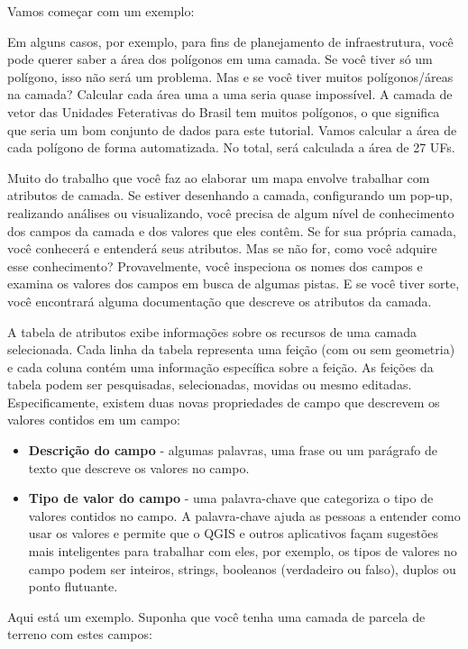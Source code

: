 \documentclass[
]{krantz}
\providecommand{\tightlist}{%
  \setlength{\itemsep}{0pt}\setlength{\parskip}{0pt}}
\begin{document}
Vamos começar com um exemplo:

Em alguns casos, por exemplo, para fins de planejamento de infraestrutura, você pode querer saber a área dos polígonos em uma camada. Se você tiver só um polígono, isso não será um problema. Mas e se você tiver muitos polígonos/áreas na camada? Calcular cada área uma a uma seria quase impossível. A camada de vetor das Unidades Feterativas do Brasil tem muitos polígonos, o que significa que seria um bom conjunto de dados para este tutorial. Vamos calcular a área de cada polígono de forma automatizada. No total, será calculada a área de 27 UFs.

Muito do trabalho que você faz ao elaborar um mapa envolve trabalhar com atributos de camada. Se estiver desenhando a camada, configurando um pop-up, realizando análises ou visualizando, você precisa de algum nível de conhecimento dos campos da camada e dos valores que eles contêm. Se for sua própria camada, você conhecerá e entenderá seus atributos. Mas se não for, como você adquire esse conhecimento? Provavelmente, você inspeciona os nomes dos campos e examina os valores dos campos em busca de algumas pistas. E se você tiver sorte, você encontrará alguma documentação que descreve os atributos da camada.

A tabela de atributos exibe informações sobre os recursos de uma camada selecionada. Cada linha da tabela representa uma feição (com ou sem geometria) e cada coluna contém uma informação específica sobre a feição. As feições da tabela podem ser pesquisadas, selecionadas, movidas ou mesmo editadas. Especificamente, existem duas novas propriedades de campo que descrevem os valores contidos em um campo:

\begin{itemize}
\tightlist
\item
  \textbf{Descrição do campo} - algumas palavras, uma frase ou um parágrafo de texto que descreve os valores no campo.
\item
  \textbf{Tipo de valor do campo} - uma palavra-chave que categoriza o tipo de valores contidos no campo. A palavra-chave ajuda as pessoas a entender como usar os valores e permite que o QGIS e outros aplicativos façam sugestões mais inteligentes para trabalhar com eles, por exemplo, os tipos de valores no campo podem ser inteiros, strings, booleanos (verdadeiro ou falso), duplos ou ponto flutuante.
\end{itemize}

Aqui está um exemplo. Suponha que você tenha uma camada de parcela de terreno com estes campos:
\end{document}
